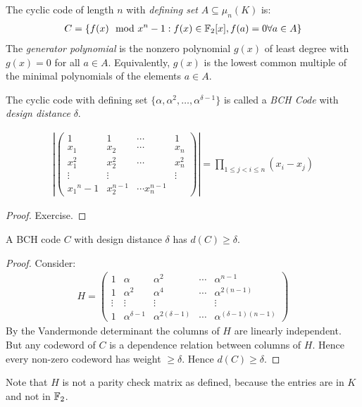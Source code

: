 \documentclass[10pt,a4paper]{article}
\begin{document}
The cyclic code of length $n$ with \emph{defining set} $A \subseteq \mu_n(K)$ is:
\begin{align*}
C = \{f(x) \mod x^n-1 : f(x) \in \mathbb{F}_2[x], f(a) = 0 \forall a \in A\}
\end{align*}
The \emph{generator polynomial} is the nonzero polynomial $g(x)$ of least degree with $g(x) = 0$ for all $a \in A$. Equivalently, $g(x)$ is the lowest common multiple of the minimal polynomials of the elements $a \in A$.

The cyclic code with defining set $\{\alpha, \alpha^2, \ldots, \alpha^{\delta - 1}\}$ is called a \emph{BCH Code} with \emph{design distance} $\delta$.

\begin{lemma}
\begin{align*}
\left| \begin{pmatrix}
1 & 1 & \cdots & 1\\
x_1 & x_2 &  \cdots & x_n \\
x_1^2 & x_2^2 & \cdots & x_n^2 \\
\vdots & \vdots & &\vdots \\
x_1{^n-1} & x_2^{n-1} & \cdots x_n^{n-1}
\end{pmatrix}\right|
= \prod_{1\leq j<i\leq n} (x_i - x_j)
\end{align*}
\end{lemma}
\begin{proof}
Exercise.
\end{proof}
\begin{theorem}
A BCH code $C$ with design distance $\delta$ has $d(C) \geq \delta$.
\end{theorem}
\begin{proof}
Consider:
\begin{align*}
H = \begin{pmatrix}
1 & \alpha & \alpha^2 & \cdots & \alpha^{n-1}\\
1 & \alpha^2 & \alpha^4 & \cdots & \alpha^{2(n-1)}\\
\vdots & \vdots & \vdots & &\vdots \\
1 & \alpha^{\delta-1} & \alpha^{2(\delta-1)} & \cdots & \alpha^{(\delta-1)(n-1)}
\end{pmatrix}
\end{align*}
By the Vandermonde determinant the columns of $H$ are linearly independent. But any codeword of $C$ is a dependence relation between columns of $H$. Hence every non-zero codeword has weight $\geq \delta$. Hence $d(C) \geq \delta$.
\end{proof}
Note that $H$ is not a parity check matrix as defined, because the entries are in $K$ and not in $\mathbb{F}_2$.
\end{document}

